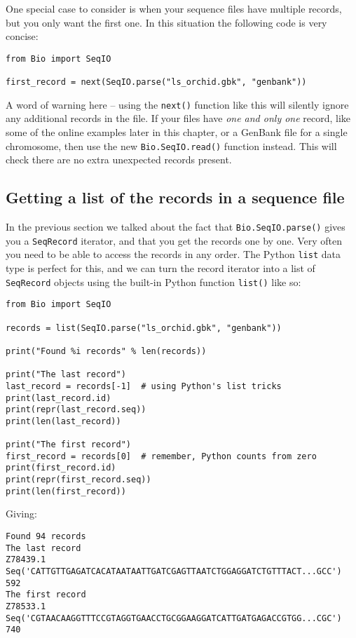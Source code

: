 One special case to consider is when your sequence files have multiple records, but you only want the first one.  In this situation the following code is very concise:

\begin{verbatim}
from Bio import SeqIO

first_record = next(SeqIO.parse("ls_orchid.gbk", "genbank"))
\end{verbatim}

A word of warning here -- using the \verb|next()| function like this will silently ignore any additional records in the file.
If your files have \textit{one and only one} record, like some of the online examples later in this chapter, or a GenBank file for a single chromosome, then use the new \verb|Bio.SeqIO.read()| function instead.
This will check there are no extra unexpected records present.

\subsection{Getting a list of the records in a sequence file}

In the previous section we talked about the fact that \verb|Bio.SeqIO.parse()| gives you a \verb|SeqRecord| iterator, and that you get the records one by one.  Very often you need to be able to access the records in any order. The Python \verb|list| data type is perfect for this, and we can turn the record iterator into a list of \verb|SeqRecord| objects using the built-in Python function \verb|list()| like so:

\begin{verbatim}
from Bio import SeqIO

records = list(SeqIO.parse("ls_orchid.gbk", "genbank"))

print("Found %i records" % len(records))

print("The last record")
last_record = records[-1]  # using Python's list tricks
print(last_record.id)
print(repr(last_record.seq))
print(len(last_record))

print("The first record")
first_record = records[0]  # remember, Python counts from zero
print(first_record.id)
print(repr(first_record.seq))
print(len(first_record))
\end{verbatim}

\noindent Giving:

\begin{verbatim}
Found 94 records
The last record
Z78439.1
Seq('CATTGTTGAGATCACATAATAATTGATCGAGTTAATCTGGAGGATCTGTTTACT...GCC')
592
The first record
Z78533.1
Seq('CGTAACAAGGTTTCCGTAGGTGAACCTGCGGAAGGATCATTGATGAGACCGTGG...CGC')
740
\end{verbatim}


